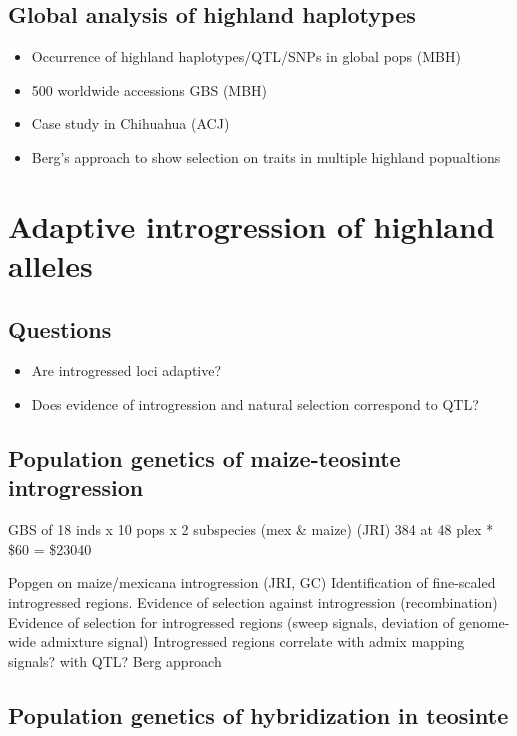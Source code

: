 \subsection{Global analysis of highland haplotypes}

\begin{itemize}
\item Occurrence of highland haplotypes/QTL/SNPs in global pops (MBH)
\item 500 worldwide accessions GBS (MBH)
\item Case study in Chihuahua (ACJ)
\item Berg's approach to show selection on traits in multiple highland popualtions
\end{itemize}


\section{Adaptive introgression of highland alleles} \label{sec:selection}

\subsection*{Questions}
\begin{itemize}
\item Are introgressed loci adaptive?
\item Does evidence of introgression and natural selection correspond to QTL?
\end{itemize}

\subsection{Population genetics of maize-teosinte introgression} \label{subsec: intropopgen}

GBS of 18 inds x 10 pops x 2 subspecies (mex \& maize) (JRI)
384 at 48 plex * \$60 = \$23040

Popgen on maize/mexicana introgression (JRI, GC)
Identification of fine-scaled introgressed regions.
Evidence of selection against introgression (recombination)
Evidence of selection for introgressed regions (sweep signals, deviation of genome-wide admixture signal)
Introgressed regions correlate with admix mapping signals? with QTL? Berg approach

\subsection{Population genetics of hybridization in teosinte} \label{subsec: admixpopgen}


